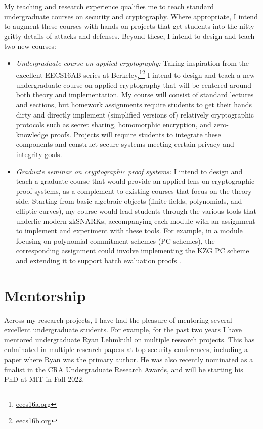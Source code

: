 \documentclass[11pt,letterpaper]{article}
\theoremstyle{definition} %
\theoremstyle{remark} %
\begin{document}
My teaching and research experience qualifies me to teach standard undergraduate courses on security and cryptography. Where appropriate, I intend to augment these courses with hands-on projects that get students into the nitty-gritty details of attacks and defenses. Beyond these, I intend to design and teach two new courses:
\begin{itemize}[noitemsep]
  \item \emph{Undergraduate course on applied cryptography:} Taking inspiration from the excellent EECS16AB series at Berkeley,\footnote{\href{https://eecs16a.org}{eecs16a.org}}\footnote{\href{https://eecs16b.org}{eecs16b.org}} I intend to design and teach a new undergraduate course on applied cryptography that will be centered around both theory and implementation. My course will consist of standard lectures and sections, but homework assignments require students to get their hands dirty and directly implement (simplified versions of) relatively cryptographic protocols such as secret sharing, homomorphic encryption, and zero-knowledge proofs. Projects will require students to integrate these components and construct secure systems meeting certain privacy and integrity goals.  


\item \emph{Graduate seminar on cryptographic proof systems:} I intend to design and teach a graduate course that would provide an applied lens on cryptographic proof systems, as a complement to existing courses that focus on the theory side. Starting from basic algebraic objects (finite fields, polynomials, and elliptic curves), my course would lead students through the various tools that underlie modern zkSNARKs, accompanying each module with an assignment to implement and experiment with these tools. For example, in a module focusing on polynomial commitment schemes (PC schemes), the corresponding assignment could involve implementing the KZG PC scheme \cite{KateZG10} and extending it to support batch evaluation proofs \cite{ChiesaHMMVW20,BonehDFG20}.
\end{itemize}


\section{Mentorship}
\label{sec:mentorship}

 Across my research projects, I have had the pleasure of mentoring several excellent undergraduate students. For example, for the past two years I have mentored undergraduate Ryan Lehmkuhl on multiple research projects. This has culminated in multiple research papers at top security conferences, including a paper where Ryan was the primary author. He was also recently nominated as a finalist in the CRA Undergraduate Research Awards, and will be starting his PhD at MIT in Fall 2022.
\end{document}

